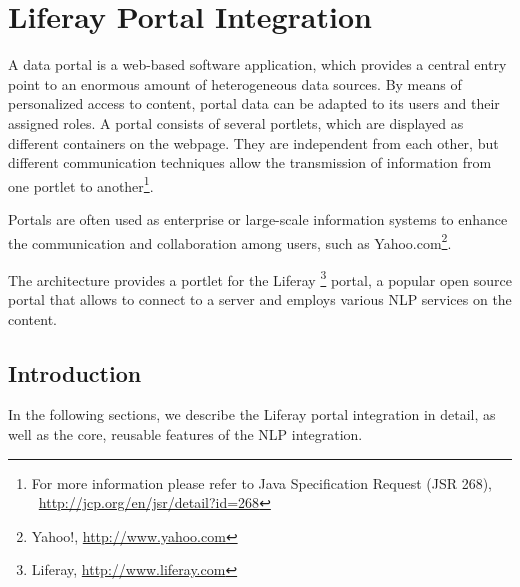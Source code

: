 %
%
%   
% 

\chapter{Liferay Portal Integration}
\label{chap:liferay}
A data portal is a web-based software application, which provides a central entry point to an enormous amount of heterogeneous data sources. By means of personalized access to content, portal data can be adapted to its users and their assigned roles. A portal consists of several portlets, which are displayed as different containers on the webpage. They are independent from each other, but different communication techniques allow the transmission of information from one portlet to another\footnote{For more information please refer to Java Specification Request (JSR 268), ~\url{http://jcp.org/en/jsr/detail?id=268}}.

Portals are often used as enterprise or large-scale information systems to enhance the communication and collaboration among users, such as Yahoo.com\footnote{Yahoo!, \url{http://www.yahoo.com}}. 

The \sa architecture provides a portlet for the Liferay \footnote{Liferay, \url{http://www.liferay.com}} portal, a popular open source portal that allows to connect to a \sa server and employs various NLP services on the content.

\section{Introduction}
In the following sections, we describe the Liferay portal integration in detail, as well as the core, reusable features of the NLP integration.

